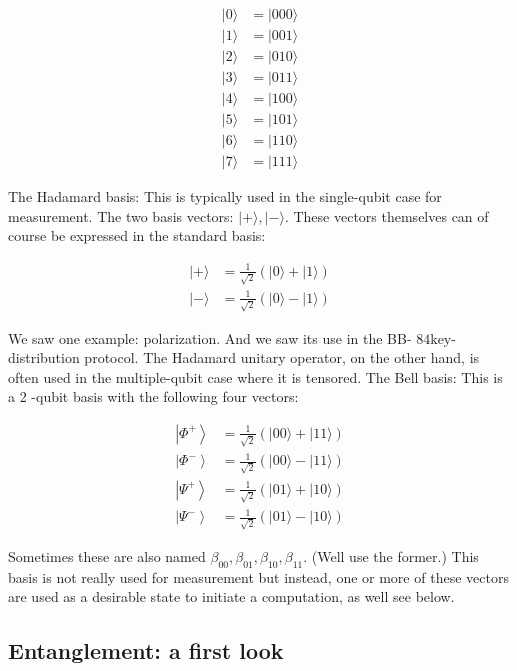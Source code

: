 \documentclass[main.tex]{subfiles}
\begin{document}
    \begin{align*}
        |0\rangle & =|000\rangle\\
        |1\rangle & =|001\rangle\\
        |2\rangle & =|010\rangle\\
        |3\rangle & =|011\rangle\\
        |4\rangle & =|100\rangle\\
        |5\rangle & =|101\rangle\\
        |6\rangle & =|110\rangle\\
        |7\rangle & =|111\rangle
    \end{align*}

    The Hadamard basis: This is typically used in the single-qubit case for measurement. The two basis vectors: $|+\rangle,|-\rangle$. These vectors themselves can of course be expressed in the standard basis:
    
    $$
    \begin{aligned}
    |+\rangle &=\frac{1}{\sqrt{2}}(|0\rangle+|1\rangle) \\
    |-\rangle &=\frac{1}{\sqrt{2}}(|0\rangle-|1\rangle)
    \end{aligned}
    $$
    
    We saw one example: polarization. And we saw its use in the BB- $84 \mathrm{key}$-distribution protocol. The Hadamard unitary operator, on the other hand, is often used in the multiple-qubit case where it is tensored. The Bell basis: This is a 2 -qubit basis with the following four vectors:
    
    $$
    \begin{aligned}
    \left|\Phi^{+}\right\rangle &=\frac{1}{\sqrt{2}}(|00\rangle+|11\rangle) \\
    \left|\Phi^{-}\right\rangle &=\frac{1}{\sqrt{2}}(|00\rangle-|11\rangle) \\
    \left|\Psi^{+}\right\rangle &=\frac{1}{\sqrt{2}}(|01\rangle+|10\rangle) \\
    \left|\Psi^{-}\right\rangle &=\frac{1}{\sqrt{2}}(|01\rangle-|10\rangle)
    \end{aligned}
    $$
    
    Sometimes these are also named $\beta_{00}, \beta_{01}, \beta_{10}, \beta_{11}$. (Well use the former.) This basis is not really used for measurement but instead, one or more of these vectors are used as a desirable state to initiate a computation, as well see below.

\subsection{Entanglement: a first look}
\end{document}
